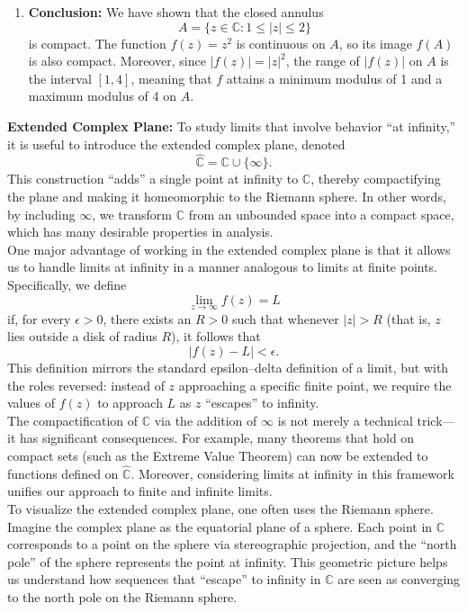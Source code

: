 \begin{example}
\begin{solution}
\begin{enumerate}
\item \textbf{Conclusion:}
We have shown that the closed annulus 
\[
A = \{ z \in \mathbb{C} : 1 \leq |z| \leq 2 \}
\]
is compact. The function \(f(z) = z^2\) is continuous on \(A\), so its image \(f(A)\) is also compact. Moreover, since \(|f(z)| = |z|^2\), the range of \(|f(z)|\) on \(A\) is the interval \([1,4]\), meaning that \(f\) attains a minimum modulus of 1 and a maximum modulus of 4 on \(A\).

\end{enumerate}
\end{solution}
\end{example}
\exampleline

\noindent \textbf{Extended Complex Plane:} To study limits that involve behavior ``at infinity,” it is useful to introduce the extended complex plane, denoted
\[
\hat{\mathbb{C}} = \mathbb{C} \cup \{\infty\}.
\]
This construction ``adds” a single point at infinity to \(\mathbb{C}\), thereby compactifying the plane and making it homeomorphic to the Riemann sphere. In other words, by including \(\infty\), we transform \(\mathbb{C}\) from an unbounded space into a compact space, which has many desirable properties in analysis. \\

\noindent One major advantage of working in the extended complex plane is that it allows us to handle limits at infinity in a manner analogous to limits at finite points. Specifically, we define
\[
\lim_{z \to \infty} f(z) = L
\]
if, for every \(\epsilon > 0\), there exists an \(R > 0\) such that whenever \(|z| > R\) (that is, \(z\) lies outside a disk of radius \(R\)), it follows that
\[
|f(z) - L| < \epsilon.
\]
\noindent This definition mirrors the standard epsilon–delta definition of a limit, but with the roles reversed: instead of \(z\) approaching a specific finite point, we require the values of \(f(z)\) to approach \(L\) as \(z\) ``escapes” to infinity. \\

\noindent The compactification of \(\mathbb{C}\) via the addition of \(\infty\) is not merely a technical trick—it has significant consequences. For example, many theorems that hold on compact sets (such as the Extreme Value Theorem) can now be extended to functions defined on \(\hat{\mathbb{C}}\). Moreover, considering limits at infinity in this framework unifies our approach to finite and infinite limits. \\

\noindent To visualize the extended complex plane, one often uses the Riemann sphere. Imagine the complex plane as the equatorial plane of a sphere. Each point in \(\mathbb{C}\) corresponds to a point on the sphere via stereographic projection, and the ``north pole” of the sphere represents the point at infinity. This geometric picture helps us understand how sequences that ``escape” to infinity in \(\mathbb{C}\) are seen as converging to the north pole on the Riemann sphere.

